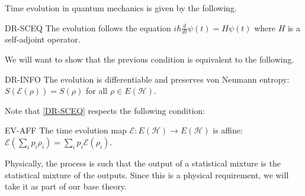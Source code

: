 \documentclass{techbrief}
\begin{document}
Time evolution in quantum mechanics is given by the following.
\begin{condition}{DR-SCEQ}
	The evolution follows the equation $i\hbar \frac{d}{dt}\psi(t) = H\psi(t)$ where $H$ is a self-adjoint operator.
\end{condition}

We will want to show that the previous condition is equivalent to the following.
\begin{condition}{DR-INFO}
	The evolution is differentiable and preserves von Neumann entropy: $S(\mathcal{E}(\rho)) = S(\rho)$ for all $\rho \in E(\mathcal{H})$.
\end{condition}

Note that \ref{DR-SCEQ} respects the following condition:
\begin{condition}{EV-AFF}
	The time evolution map $\mathcal{E} : E(\mathcal{H}) \to E(\mathcal{H})$ is affine: $\mathcal{E}(\sum_i p_i \rho_i) = \sum_i p_i \mathcal{E}(\rho_i)$.
\end{condition}
Physically, the process is such that the output of a statistical mixture is the statistical mixture of the outputs. Since this is a physical requirement, we will take it as part of our base theory.
\end{document}
